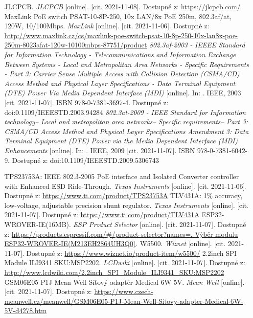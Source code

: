 \begin{thebibliography}{3}
JLCPCB. \textit{JLCPCB} [online]. [cit. 2021-11-08]. Dostupné z: \url{https://jlcpcb.com/}
MaxLink PoE switch PSAT-10-8P-250, 10x LAN/8x PoE 250m, 802.3af/at, 120W, 10/100Mbps. \textit{MaxLink} [online]. [cit. 2021-11-06]. Dostupné z: \url{http://www.maxlink.cz/cs/maxlink-poe-switch-psat-10-8p-250-10x-lan8x-poe-250m-8023afat-120w-10100mbps-87751/product}
\textit{802.3af-2003 - IEEEE Standard for Information Technology - Telecommunications and Information Exchange Between Systems - Local and Metropolitan Area Networks - Specific Requirements - Part 3: Carrier Sense Multiple Access with Collision Detection (CSMA/CD) Access Method and Physical Layer Specifications - Data Terminal Equipment (DTE) Power Via Media Dependent Interface (MDI)} [online]. In: . IEEE, 2003 [cit. 2021-11-07]. ISBN 978-0-7381-3697-4. Dostupné z: doi:0.1109/IEEESTD.2003.94284
\textit{802.3at-2009 - IEEE Standard for Information technology-- Local and metropolitan area networks-- Specific requirements-- Part 3: CSMA/CD Access Method and Physical Layer Specifications Amendment 3: Data Terminal Equipment (DTE) Power via the Media Dependent Interface (MDI) Enhancements} [online]. In: . IEEE, 2009 [cit. 2021-11-07]. ISBN 978-0-7381-6042-9. Dostupné z: doi:10.1109/IEEESTD.2009.5306743

TPS23753A: IEEE 802.3-2005 PoE interface and Isolated Converter controller with Enhanced ESD Ride-Through. \textit{Texas Instruments} [online]. [cit. 2021-11-06]. Dostupné z: \url{https://www.ti.com/product/TPS23753A}
TLV431A: 1\% accuracy, low-voltage, adjustable precision shunt regulator. \textit{Texas Instruments} [online]. [cit. 2021-11-07]. Dostupné z: \url{https://www.ti.com/product/TLV431A}
ESP32-WROVER-IE(16MB). \textit{ESP Product Selector} [online]. [cit. 2021-11-07]. Dostupné z: \url{https://products.espressif.com/#/product-selector?names=. Výběr modulu ESP32-WROVER-IE(M213EH2864UH3Q0)}.
W5500. \textit{Wiznet} [online]. [cit. 2021-11-07]. Dostupné z: \url{https://www.wiznet.io/product-item/w5500/}
2.2inch SPI Module ILI9341 SKU:MSP2202. \textit{LCDwiki} [online]. [cit. 2021-11-07]. Dostupné z:  \url{http://www.lcdwiki.com/2.2inch_SPI_Module_ILI9341_SKU:MSP2202}
GSM06E05-P1J Mean Well Síťový adaptér Medical 6W 5V. \textit{Mean Well} [online]. [cit. 2021-11-07]. Dostupné z:  \url{https://www.czech-meanwell.cz/meanwell/GSM06E05-P1J-Mean-Well-Sitovy-adapter-Medical-6W-5V-d4278.htm}


\end{thebibliography}
